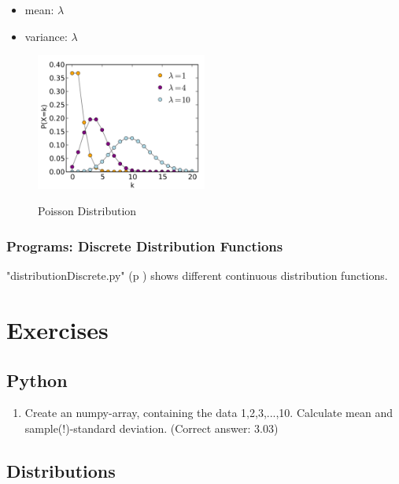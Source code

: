 \begin{itemize}
    \item mean: $\lambda$
    \item variance: $\lambda$
\end{itemize}

\begin{figure}
  \centering
  \includegraphics[width=0.5\textwidth]{../Images/Poisson_pmf.png}\\
  \caption{Poisson Distribution}
\end{figure}

\subsubsection{Programs: Discrete Distribution Functions} 

\PyImg "distributionDiscrete.py" (p \pageref{py:discrete}) shows different continuous distribution functions.

\section{Exercises}

\subsection*{Python}
\begin{enumerate}
  \item Create an numpy-array, containing the data 1,2,3,...,10. Calculate mean and sample(!)-standard deviation.
    (Correct answer: 3.03)
\end{enumerate}

\subsection*{Distributions}


